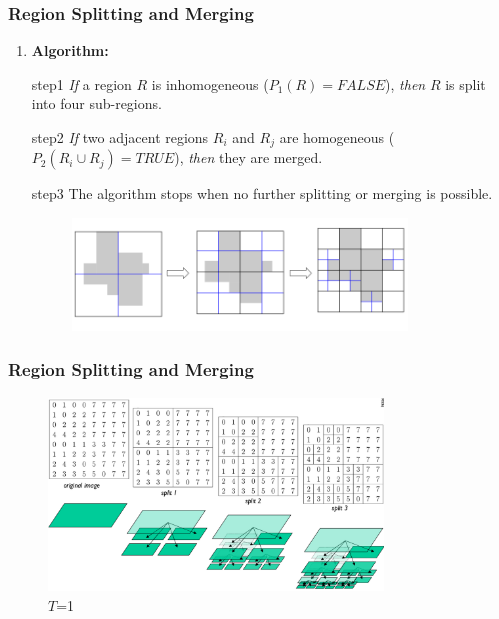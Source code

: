 \documentclass[notheorems,mathserif,table,compress]{beamer}  %
\begin{document}
\begin{frame}
    \frametitle{Region Splitting and Merging}
    \begin{enumerate}[{\color{black}{\Large (B)}}]
    \item  \textbf{\Large Algorithm:}
    \end{enumerate}
    \begin{itemize}
    \item[step1] {\emph{If}} a region $R$ is inhomogeneous ($P_1(R)=FALSE$), {\emph{then}} $R$ is split into four sub-regions.
    \item[step2] {\emph{If}} two adjacent regions $R_i$ and $R_j$ are homogeneous ($P_2(R_i \cup R_j)=TRUE$), {\emph{then}} they are  merged.
    \item[step3] The algorithm stops when no further splitting or merging is possible.
  \begin{figure}[!ht]
  \centering\includegraphics[width=3.5in]{split.png}
  \end{figure} 
    \end{itemize}
\end{frame}

\begin{frame}
  \frametitle{Region Splitting and Merging}
  \begin{figure}[!ht]
  \centering\includegraphics[width=3.5in]{tree2.png}
  \caption{$T$=1}
  \end{figure} 
\end{frame}

\end{document}
